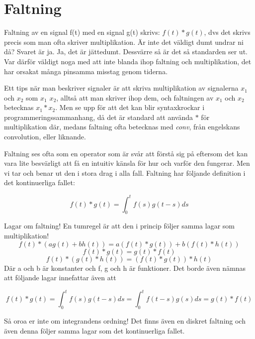 \documentclass{article}
\begin{document}
\section{Faltning}

Faltning av en signal f(t) med en signal g(t) skrivs: $f(t)*g(t)$, dvs det
skrivs precis som man ofta skriver multiplikation. Är inte det väldigt dumt
undrar ni då? Svaret är ja. Ja, det är jättedumt. Dessvärre så är det så
standarden ser ut. Var därför väldigt noga med att inte blanda ihop faltning
och multiplikation, det har orsakat många pinsamma misstag genom tiderna.
\newline

Ett tips när man beskriver signaler är att skriva multiplikation
av signalerna $x_1$ och $x_2$ som \emph{$x_1$ $x_2$}, alltså att man skriver ihop dem,
och faltningen av $x_1$ och $x_2$ betecknas $x_1 * x_2$. Men se upp för att det
kan blir syntaxkrockar i programmeringssammanhang, då det är standard att
använda $*$ för multiplikation där, medans faltning ofta betecknas med \emph{conv}, från engelskans convolution, eller liknande.


Faltning ses ofta som en operator som är svår att förstå sig på eftersom
det kan vara lite besvärligt att få en intuitiv känsla för hur och varför
den fungerar. Men vi tar och benar ut den i stora drag i alla fall.
Faltning har följande definition i det kontinuerliga fallet:

$$ f(t) * g(t) = \int_{0}^t  f(s) g(t-s) ds $$

Lagar om faltning! En tumregel är att den i princip följer samma lagar som multiplikation!
$$f(t) * (a g(t) + b h(t) ) = a(f(t) * g(t)) + b(f(t) * h(t))$$ %
$$f(t) * g(t) = g(t) * f(t) $$ %
$$f(t) * (g(t) * h(t)) = (f(t) * g(t)) * h(t) $$ %
Där a och b är konstanter och f, g och h är funktioner. Det borde även nämnas att följande lagar innefattar även att

$$ f(t) * g(t) = \int_{0}^t  f(s) g(t-s) ds = \int_{0}^t  f(t-s) g(s) ds = g(t) * f(t) $$

Så oroa er inte om integrandens ordning! Det finns även en diskret faltning och även denna följer samma lagar som det kontinuerliga fallet.

\end{document}
